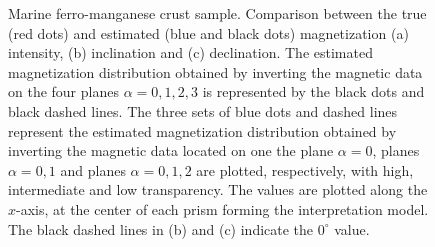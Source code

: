 \documentclass[draft,gc]{agutex}
\begin{document}
\begin{figure}
 \caption{Marine ferro-manganese crust sample. 
 Comparison between the true (red dots)
 and estimated (blue and black dots) magnetization 
 (a) intensity, (b) inclination and (c) declination.
 The estimated magnetization distribution obtained by 
 inverting the magnetic data on the four planes $\alpha = 0, 1, 2, 3$
 is represented
 by the black dots and black dashed lines. The three sets of
 blue dots and dashed lines represent the estimated 
 magnetization distribution obtained by inverting the 
 magnetic data located on one the plane $\alpha = 0$,
 planes $\alpha = 0, 1$ and planes $\alpha = 0, 1, 2$
 are plotted, respectively, with high, intermediate and low 
 transparency.
 The values are plotted along the $x$-axis, at the center of each 
 prism forming the interpretation model.
 The black dashed lines in (b) and (c) indicate the $0^{\circ}$ value.}
 \label{fig:estimate-oda}
 \end{figure}
\end{document}

